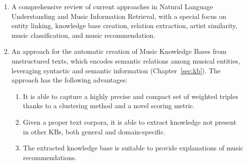 \begin{enumerate}

\item 
A comprehensive review of current approaches in Natural Language Understanding and Music Information Retrieval, with a special focus on entity linking, knowledge base creation, relation extraction, artist similarity, music classification, and music recommendation.


\item 
An approach for the automatic creation of Music Knowledge Bases from unstructured texts, which encodes semantic relations among musical entities, leveraging syntactic and semantic information (Chapter~\ref{sec:kb}). %
The approach has the following advantages:

\begin{enumerate}
\item 
It is able to capture a highly precise and compact set of weighted triples thanks to a clustering method and a novel scoring metric. 
\item 
Given a proper text corpora, it is able to extract knowledge not present in other KBs, both general and domain-specific. 
\item
The extracted knowledge base is suitable to provide explanations of music recommendations.
\end{enumerate}


\end{enumerate}
